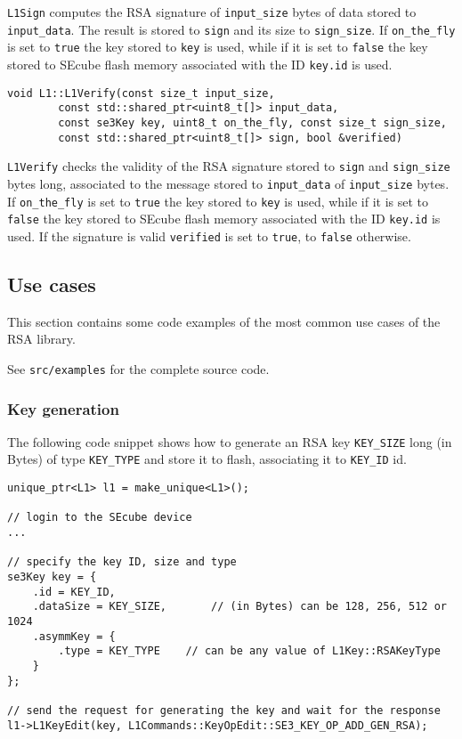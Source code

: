 \texttt{L1Sign} computes the RSA signature of \texttt{input\_size} bytes of
data stored to \texttt{input\_data}.
The result is stored to \texttt{sign} and its size to \texttt{sign\_size}.
If \texttt{on\_the\_fly} is set to \texttt{true} the key stored to \texttt{key}
is used, while if it is set to \texttt{false} the key stored to SEcube flash
memory associated with the ID \texttt{key.id} is used.

\begin{lstlisting}
void L1::L1Verify(const size_t input_size,
		const std::shared_ptr<uint8_t[]> input_data,
		const se3Key key, uint8_t on_the_fly, const size_t sign_size,
		const std::shared_ptr<uint8_t[]> sign, bool &verified)
\end{lstlisting}
\texttt{L1Verify} checks the validity of the RSA signature stored to
\texttt{sign} and \texttt{sign\_size} bytes long, associated to the message
stored to \texttt{input\_data} of \texttt{input\_size} bytes.
If \texttt{on\_the\_fly} is set to \texttt{true} the key stored to \texttt{key}
is used, while if it is set to \texttt{false} the key stored to SEcube flash
memory associated with the ID \texttt{key.id} is used.
If the signature is valid \texttt{verified} is set to \texttt{true}, to
\texttt{false} otherwise.

\subsection{Use cases}
This section contains some code examples of the most common use cases of the
RSA library.

See \texttt{src/examples} for the complete source code.

\subsubsection{Key generation}
The following code snippet shows how to generate an RSA key \texttt{KEY\_SIZE}
long (in Bytes) of type \texttt{KEY\_TYPE} and store it to flash, associating
it to \texttt{KEY\_ID} id.
\begin{lstlisting}
unique_ptr<L1> l1 = make_unique<L1>();

// login to the SEcube device
...

// specify the key ID, size and type
se3Key key = {
	.id = KEY_ID,
	.dataSize = KEY_SIZE,		// (in Bytes) can be 128, 256, 512 or 1024
	.asymmKey = {
		.type = KEY_TYPE	// can be any value of L1Key::RSAKeyType
	}
};

// send the request for generating the key and wait for the response
l1->L1KeyEdit(key, L1Commands::KeyOpEdit::SE3_KEY_OP_ADD_GEN_RSA);
\end{lstlisting}
